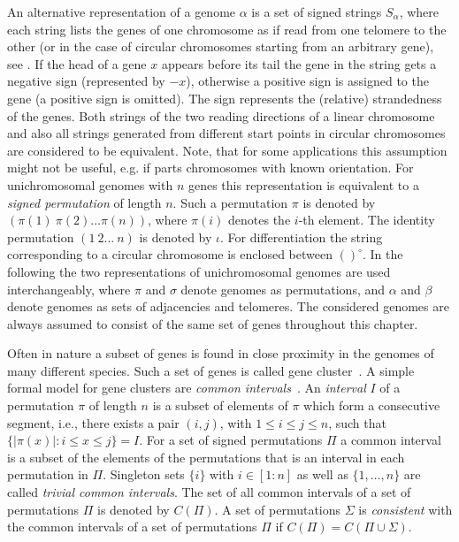 \documentclass{svmult}
\begin{document}
An alternative representation of a genome $\alpha$ is a set of signed strings
$S_{\alpha}$, where each string lists the genes of one chromosome as if 
read from one telomere to the other (or in the case of circular chromosomes
starting from an arbitrary gene), see . 
If the head of a gene $x$ appears before its tail the gene in the string
gets a negative sign (represented by $-{x}$), otherwise a positive
sign is assigned to the gene (a positive sign is omitted).
The sign represents the (relative) strandedness of the genes. 
Both strings of the two reading directions of a linear
chromosome and also all strings generated from different start points in circular chromosomes are considered to be equivalent.
Note, that for some applications this assumption might not be useful, e.g. if parts chromosomes with known orientation.
For unichromosomal genomes with $n$ genes
this representation is equivalent to a \emph{signed permutation} of length
$n$. Such a permutation $\pi$ is denoted by
$(\pi(1)~\pi(2)\ldots\pi(n))$, where $\pi(i)$ denotes the $i$-th element.
The identity permutation $(1~2\ldots ~n)$ is denoted by $\iota$.
For differentiation the string corresponding to a circular chromosome is enclosed between $()^\circ$.
In the following the two representations of unichromosomal genomes are
used interchangeably, where $\pi$ and $\sigma$ denote genomes as permutations,
and $\alpha$ and $\beta$ denote genomes as sets of adjacencies and telomeres.
The considered genomes are always assumed to consist of the same
set of genes throughout this chapter.

Often in nature a subset of genes is found in close proximity in the genomes 
of many different species. Such a set of genes is called gene
cluster~\cite{Graham_1995}.
A simple formal model for gene clusters are \emph{common intervals}~\cite{Heber_2001}. An \emph{interval} 
$I$ of a permutation $\pi$ of length $n$ is a subset of elements of $\pi$ which form a consecutive segment, i.e., 
there exists a pair $(i,j)$, with $1 \leq i \le j \leq n$, such that
$\{|\pi(x)|:
i\leq x \leq j\}=I$.
For a set of signed permutations $\Pi$ a common interval is a subset of the elements of the permutations that 
is an interval in each permutation in $\Pi$. Singleton sets $\{i\}$ with $i\in[1:n]$ as well as $\{1,\ldots,n\}$ 
are called \emph{trivial common intervals}.
The set of all common intervals of a set of permutations $\Pi$ is denoted by
$C(\Pi)$.
A set of permutations $\Sigma$ is \emph{consistent} with the common intervals
of a set of permutations $\Pi$ if $C(\Pi)=C(\Pi \cup \Sigma)$.
\end{document}
